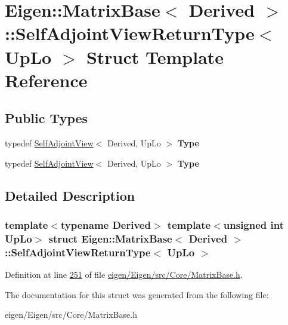 \hypertarget{struct_eigen_1_1_matrix_base_1_1_self_adjoint_view_return_type}{}\section{Eigen\+:\+:Matrix\+Base$<$ Derived $>$\+:\+:Self\+Adjoint\+View\+Return\+Type$<$ Up\+Lo $>$ Struct Template Reference}
\label{struct_eigen_1_1_matrix_base_1_1_self_adjoint_view_return_type}
\subsection*{Public Types}
\begin{DoxyCompactItemize}
\item 
\mbox{\label{struct_eigen_1_1_matrix_base_1_1_self_adjoint_view_return_type_a5773a46c08e277d36bc4c4d790436c2b}} 
typedef \hyperlink{group___core___module_class_eigen_1_1_self_adjoint_view}{Self\+Adjoint\+View}$<$ Derived, Up\+Lo $>$ {\bfseries Type}
\item 
\mbox{\label{struct_eigen_1_1_matrix_base_1_1_self_adjoint_view_return_type_a5773a46c08e277d36bc4c4d790436c2b}} 
typedef \hyperlink{group___core___module_class_eigen_1_1_self_adjoint_view}{Self\+Adjoint\+View}$<$ Derived, Up\+Lo $>$ {\bfseries Type}
\end{DoxyCompactItemize}


\subsection{Detailed Description}
\subsubsection*{template$<$typename Derived$>$\newline
template$<$unsigned int Up\+Lo$>$\newline
struct Eigen\+::\+Matrix\+Base$<$ Derived $>$\+::\+Self\+Adjoint\+View\+Return\+Type$<$ Up\+Lo $>$}



Definition at line \hyperlink{eigen_2_eigen_2src_2_core_2_matrix_base_8h_source_l00251}{251} of file \hyperlink{eigen_2_eigen_2src_2_core_2_matrix_base_8h_source}{eigen/\+Eigen/src/\+Core/\+Matrix\+Base.\+h}.



The documentation for this struct was generated from the following file\+:\begin{DoxyCompactItemize}
\item 
eigen/\+Eigen/src/\+Core/\+Matrix\+Base.\+h\end{DoxyCompactItemize}
